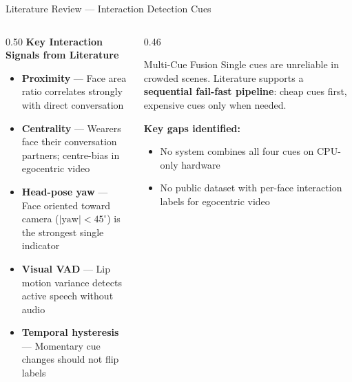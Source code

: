 \documentclass[aspectratio=169]{beamer}
\begin{document}
\begin{frame}{Literature Review — Interaction Detection Cues}
\begin{columns}[T]
\begin{column}{0.50\textwidth}
  \textbf{Key Interaction Signals from Literature}
  \vspace{0.15cm}
  \begin{itemize}\setlength{\itemsep}{0.3cm}
    \item \textbf{Proximity} — Face area ratio correlates strongly with direct conversation
    \item \textbf{Centrality} — Wearers face their conversation partners; centre-bias in egocentric video
    \item \textbf{Head-pose yaw} — Face oriented toward camera ($|\text{yaw}|<45^\circ$) is the strongest single indicator
    \item \textbf{Visual VAD} — Lip motion variance detects active speech without audio
    \item \textbf{Temporal hysteresis} — Momentary cue changes should not flip labels
  \end{itemize}
\end{column}
\begin{column}{0.46\textwidth}
  \begin{block}{Multi-Cue Fusion}
    Single cues are unreliable in crowded scenes. Literature supports a \textbf{sequential fail-fast pipeline}: cheap cues first, expensive cues only when needed.
  \end{block}
  \vspace{0.4cm}
  \textbf{Key gaps identified:}
  \begin{itemize}\setlength{\itemsep}{0.2cm}
    \item No system combines all four cues on CPU-only hardware
    \item No public dataset with per-face interaction labels for egocentric video
  \end{itemize}
\end{column}
\end{columns}
\end{frame}
\end{document}
